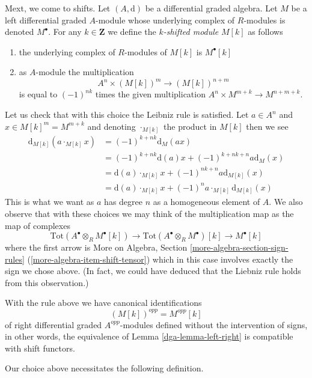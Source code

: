 Mext, we come to shifts. Let $(A, \text{d})$ be a differential graded algebra.
Let $M$ be a left differential graded $A$-module whose underlying complex
of $R$-modules is denoted $M^\bullet$.
For any $k \in \mathbf{Z}$ we define the {\it $k$-shifted module}
$M[k]$ as follows
\begin{enumerate}
\item the underlying complex of $R$-modules of $M[k]$ is $M^\bullet[k]$
\item as $A$-module the multiplication
$$
A^n \times (M[k])^m \longrightarrow (M[k])^{n + m}
$$
is equal to $(-1)^{nk}$ times the given multiplication
$A^n \times M^{m + k} \to M^{n + m + k}$.
\end{enumerate}
Let us check that with this choice the Leibniz rule is satisfied.
Let $a \in A^n$ and $x \in M[k]^m = M^{m + k}$ and denoting
$\cdot_{M[k]}$ the product in $M[k]$ then we see
\begin{align*}
\text{d}_{M[k]}(a \cdot_{M[k]} x)
& =
(-1)^{k + nk} \text{d}_M(ax) \\
& =
(-1)^{k + nk} \text{d}(a) x + (-1)^{k + nk + n} a \text{d}_M(x) \\
& =
\text{d}(a) \cdot_{M[k]} x + (-1)^{nk + n} a \text{d}_{M[k]}(x) \\
& =
\text{d}(a) \cdot_{M[k]} x + (-1)^n a \cdot_{M[k]} \text{d}_{M[k]}(x)
\end{align*}
This is what we want as $a$ has degree $n$ as a homogeneous element of $A$.
We also observe that with these choices we may think of
the multiplication map as the map of complexes
$$
\text{Tot}(A^\bullet \otimes_R M^\bullet[k]) \to
\text{Tot}(A^\bullet \otimes_R M^\bullet)[k] \to
M^\bullet[k]
$$
where the first arrow is
More on Algebra, Section \ref{more-algebra-section-sign-rules}
(\ref{more-algebra-item-shift-tensor}) which in this
case involves exactly the sign we chose above. (In fact, we could have deduced
that the Liebniz rule holds from this observation.)

\medskip\noindent
With the rule above we have canonical identifications
$$
(M[k])^{opp} = M^{opp}[k]
$$
of right differential graded $A^{opp}$-modules
defined without the intervention of signs, in other words, the equivalence
of Lemma \ref{dga-lemma-left-right} is compatible with shift functors.

\medskip\noindent
Our choice above necessitates the following definition.

